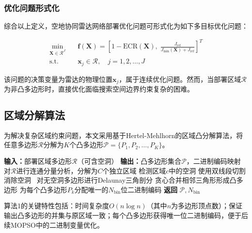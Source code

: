 \subsubsection{优化问题形式化}

综合以上定义，空地协同雷达网络部署优化问题可形式化为如下多目标优化问题：

\begin{equation}
\begin{aligned}
\min_{\mathbf{X} \in \mathcal{R}^J} \quad & \mathbf{f}(\mathbf{X}) = \left[1 - \text{ECR}(\mathbf{X}), \; \frac{J_{\text{ref}}}{J_{\min}(\mathbf{X}) + J_{\text{ref}}}\right]^T \\
\text{s.t.} \quad & \mathbf{x}_j \in \mathcal{R}, \quad j = 1, 2, \ldots, J
\end{aligned}
\label{eq:optimization_problem}
\end{equation}

该问题的决策变量为雷达的物理位置$\mathbf{x}_j$，属于连续优化问题。然而，当部署区域$\mathcal{R}$为非凸多边形时，直接优化面临搜索空间边界约束复杂的困难。

\subsection{区域分解算法}

为解决复杂区域约束问题，本文采用基于Hertel-Mehlhorn的区域凸分解算法，将任意多边形$\mathcal{R}$分解为$K$个凸多边形$\mathcal{P} = \{P_1, P_2, \ldots, P_K\}$。

\begin{algorithm}[t]
\caption{区域凸分解算法}
\label{alg:decomposition}
\begin{algorithmic}[1]
\STATE \textbf{输入：}部署区域多边形$\mathcal{R}$（可含空洞）
\STATE \textbf{输出：}凸多边形集合$\mathcal{P}$，二进制编码映射
\STATE 对$\mathcal{R}$进行连通分量分析，分解为$C$个独立区域
    \STATE 检测区域$c$中的空洞
        \STATE 使用双线段切割消除空洞~\cite{Chazelle1982}
    \ENDIF
    \STATE 对无空洞多边形进行Delaunay三角剖分
    \STATE 贪心合并相邻三角形形成凸多边形
\ENDFOR
\STATE 为每个凸多边形$P_k$分配唯一的$N_{\text{bin}}$位二进制编码
\STATE \textbf{返回} $\mathcal{P}, N_{\text{bin}}$
\end{algorithmic}
\end{algorithm}

算法1的关键特性包括：时间复杂度$O(n \log n)$（其中$n$为多边形顶点数）；保证输出凸多边形的并集与原区域一致；每个凸多边形获得唯一位二进制编码，便于后续MOPSO中的二进制变量优化。

